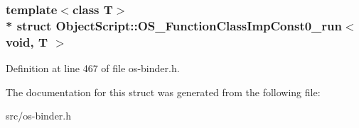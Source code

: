 \subsubsection*{template$<$class T$>$\\*
struct Object\+Script\+::\+O\+S\+\_\+\+Function\+Class\+Imp\+Const0\+\_\+run$<$ void, T                           $>$}



Definition at line 467 of file os-\/binder.\+h.



The documentation for this struct was generated from the following file\+:\begin{DoxyCompactItemize}
\item 
src/os-\/binder.\+h\end{DoxyCompactItemize}
